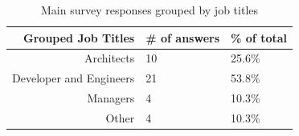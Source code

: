 \documentclass{cslthse-msc}
\begin{document}
    \begin{table}[H]
        \centering
        \caption{Main survey responses grouped by job titles}
        \label{tabl:jobs}
        \begin{tabularx}{\columnwidth}{r l l}
            \textbf{Grouped Job Titles} &    \textbf{\# of answers} &     \textbf{\% of total} \\\hline
            Architects              & 10           & 25.6\%  \\ \hline
            Developer and Engineers & 21           & 53.8\%  \\\hline
            Managers                & 4            & 10.3\%  \\\hline
            Other                   & 4            & 10.3\%  \\\hline
        \end{tabularx}
    \end{table}
\end{document}
